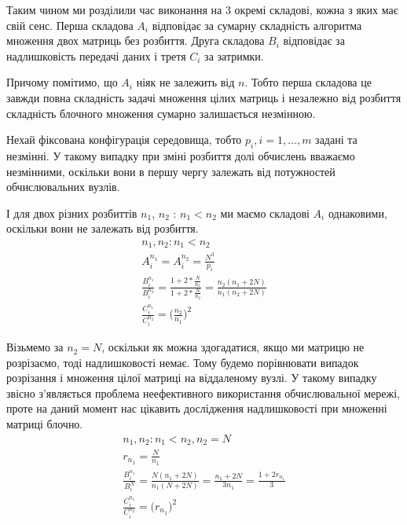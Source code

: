 Таким чином ми розділили час виконання на 3 окремі складові, кожна з яких має свій сенс. Перша складова $A_i$ відповідає за сумарну складність алгоритма множення двох матриць без розбиття. Друга складова $B_i$ відповідає за надлишковість передачі даних і третя $C_i$ за затримки.

Причому помітимо, що $A_i$ ніяк не залежить від $n$. Тобто перша складова це завжди повна складність задачі множення цілих матриць і незалежно від розбиття складність блочного множення сумарно залишається незмінною.

Нехай фіксована конфігурація середовища, тобто $p_i, i=1,\ldots,m$ задані та незмінні. У такому випадку при зміні розбиття долі обчислень вважаємо незмінними, оскільки вони в першу чергу залежать від потужностей обчислювальних вузлів.

І для двох різних розбиттів $n_1$, $n_2$ : $n_1 < n_2$ ми маємо складові $A_i$ однаковими, оскільки вони не залежать від розбиття.
\begin{equation}
	\label{eq:diff_n1n2}
	\begin{gathered}
		n_1, n_2 : n_1 < n_2
		\\
		A_i^{n_1} = A_i^{n_2} = \frac{N^3}{p_i}
		\\
		\frac{B_i^{n_1}}{B_i^{n_2}} = \frac{1 + 2*\frac{N}{n_1}}{1 + 2*\frac{N}{n_2}} =\frac{ n_2 ( n_1 + 2N ) }{n_1 ( n_2 + 2N )}
		\\
		\frac{C_i^{n_1}}{C_i^{n_2}} = \bigg( \frac{n_2}{n_1} \bigg)^2
	\end{gathered}
\end{equation}

Візьмемо за $n_2=N$, оскільки як можна здогадатися, якщо ми матрицю не розрізаємо, тоді надлишковості немає. Тому будемо порівнювати випадок розрізання і множення цілої матриці на віддаленому вузлі. У такому випадку звісно з'являється проблема неефективного використання обчислювальної мережі, проте на даний момент нас цікавить дослідження надлишковості при множенні матриці блочно.
\begin{equation}
\label{eq:diff_n1n22}
	\begin{gathered}
	n_1, n_2 : n_1 < n_2, n_2 = N
	\\
	r_{n_1} = \frac{N}{n_{1}}
	\\
	\frac{B_i^{n_1}}{B_i^{N}} =\frac{ N ( n_1 + 2N ) }{n_1 ( N + 2N )} = \frac{n_1 + 2N}{3n_1} = \frac{1 + 2r_{n_1}}{3}
	\\
	\frac{C_i^{n_1}}{C_i^{n_2}} = \bigg( r_{n_1} \bigg)^2
	\end{gathered}
\end{equation}

